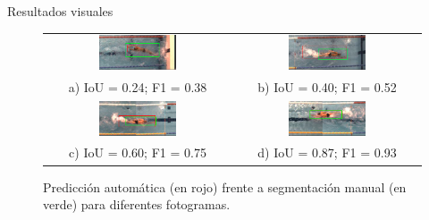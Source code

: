 \documentclass[11pt]{beamer}
\begin{document}
        \begin{frame}{Resultados visuales}
            \begin{figure}[h!]
                \centering
                \begin{tabular}{cc}
                    \includegraphics[width=0.43\textwidth,height=0.43\textheight,keepaspectratio]{imagenes/mala_1099.png} &
                    \includegraphics[width=0.43\textwidth,height=0.43\textheight,keepaspectratio]{imagenes/muchisima_agua_1014.png}
                    \\ a) IoU = 0.24; F1 = 0.38 & b) IoU = 0.40; F1 = 0.52  \\
                    \includegraphics[width=0.43\textwidth,height=0.43\textheight,keepaspectratio]{imagenes/mucha_agua_897.png} &
                    \includegraphics[width=0.43\textwidth,height=0.43\textheight,keepaspectratio]{imagenes/excelentisimo_1241.png}
                    \\ c) IoU = 0.60; F1 = 0.75  & d) IoU = 0.87; F1 = 0.93
                 \end{tabular}
                 \caption{Predicción automática (en rojo) frente a segmentación manual (en verde) para diferentes fotogramas.}
                 \label{fig:iouvisualimgs}
            \end{figure}
        \end{frame}
        
\end{document}
